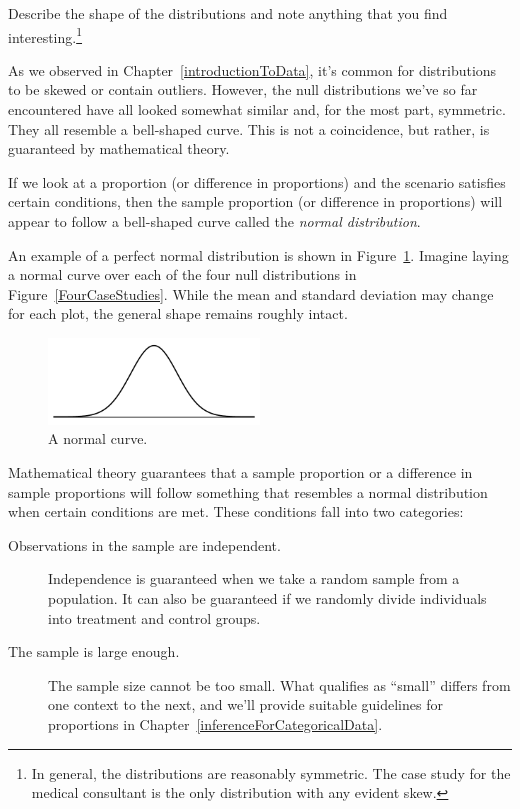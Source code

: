 \begin{exercise}
Describe the shape of the distributions and note anything that you find interesting.\footnote{In general, the distributions are reasonably symmetric. The case study for the medical consultant is the only distribution with any evident skew.}
\end{exercise}

As we observed in Chapter~\ref{introductionToData}, it's common for distributions to be skewed or contain outliers. However, the null distributions we've so far encountered have all looked somewhat similar and, for the most part, symmetric. They all resemble a bell-shaped curve. This is not a coincidence, but rather, is guaranteed by  mathematical theory.

\begin{termBox}{
If we look at a proportion (or difference in proportions) and the scenario satisfies certain conditions, then the sample proportion (or difference in proportions) will appear to follow a bell-shaped curve called the \emph{normal distribution}.}
\end{termBox}

An example of a perfect normal distribution is shown in Figure~\ref{simpleNormal}. Imagine laying a normal curve over each of the four null distributions in Figure~\ref{FourCaseStudies}. While the mean and standard deviation may change for each plot, the general shape remains roughly intact.

\begin{figure}[ht]
\centering
\includegraphics[width=0.5\textwidth]{02/figures/simpleNormal/simpleNormal}
\caption{A normal curve.}
\label{simpleNormal}
\end{figure}

Mathematical theory guarantees that a sample proportion or a difference in sample proportions will follow something that resembles a normal distribution when certain conditions are met. These conditions fall into two categories:
\begin{description}
\item[Observations in the sample are independent.] Independence is guaranteed when we take a random sample from a population. It can also be guaranteed if we randomly divide individuals into treatment and control groups.
\item[The sample is large enough.] The sample size cannot be too small. What qualifies as ``small'' differs from one context to the next, and we'll provide suitable guidelines for proportions in Chapter~\ref{inferenceForCategoricalData}.
\end{description}

